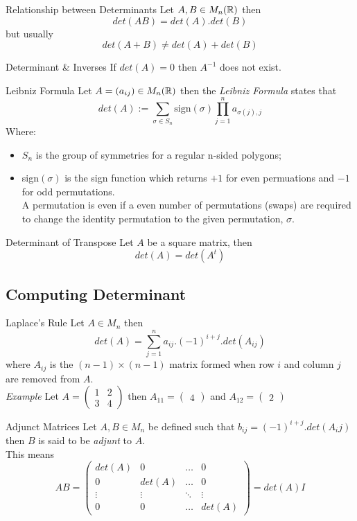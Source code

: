 \documentclass[11pt,a4paper]{article}
\begin{document}
\subtitle{Theorem 6.05 - }{Relationship between Determinants}
Let $A, B \in M_{n}(\mathbb{R})$ then $$det(AB) = det(A).det(B)$$ but usually $$det(A + B) \not = det(A) + det(B)$$

\subtitle{Theorem 6.06 - }{Determinant \& Inverses}
If $det(A) = 0$ then $A^{-1}$ does not exist. \\

\subtitle{Theorem 6.07 - }{Leibniz Formula}
Let $A = (a_{ij}) \in M_n(\mathbb{R})$ then the \textit{Leibniz Formula} states that $$det(A) := \sum_{\sigma \in S_n} \mathrm{sign}(\sigma) \prod_{j=1}^{n}a_{\sigma(j),j}$$
Where: \begin{itemize}[label={-}]
  \item $S_n$ is the group of symmetries for a regular n-sided polygons;
  \item sign$(\sigma)$ is the sign function which returns $+1$ for even permuations and $-1$ for odd permutations. \\
  A permutation is even if a even number of permutations (swaps) are required to change the identity permutation to the given permutation, $\sigma$.
\end{itemize}

\subtitle{Remark 6.08 - }{Determinant of Transpose}
Let $A$ be a square matrix, then $$det(A) = det(A^t)$$

\subsection{Computing Determinant}

\subtitle{Theorem 6.09 - }{Laplace's Rule}
Let $A \in M_n$ then $$det(A) = \sum_{j=1}^n a_{ij} . (-1)^{i+j} . det(A_{ij})$$ where $A_{ij}$ is the $(n-1) \times (n-1)$ matrix formed when row $i$ and column $j$ are removed from $A$.\\
\textit{Example} Let $A = \begin{pmatrix} 1 & 2 \\ 3 & 4 \end{pmatrix}$ then $A_{11} = \begin{pmatrix} 4 \end{pmatrix}$ and $A_{12} = \begin{pmatrix} 2 \end{pmatrix}$

\subtitle{Definition 6.10 - }{Adjunct Matrices}
Let $A, B \in M_n$ be defined such that $b_{ij} = (-1)^{i+j} . det(A_ij)$ then $B$ is said to be \textit{adjunt} to $A$. \\
This means $$AB = \begin{pmatrix} det(A) & 0 & \dots & 0 \\ 0 & det(A) & \dots & 0 \\ \vdots & \vdots & \ddots & \vdots \\ 0 & 0 & \dots & det(A) \end{pmatrix} = det(A)I$$
\end{document}
